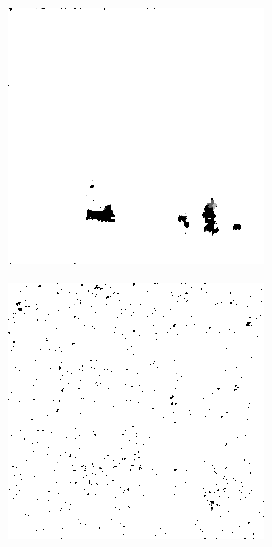 \begin{figure}[H]
\begin{minipage}[t]{0.245\textwidth}
    \label{fig:noise_15_6}
    \includegraphics[width = \textwidth]{result/noisy/1_15_0.png}
    \label{fig:noise_15_0}
\end{minipage}
\begin{minipage}[t]{0.245\textwidth}
    \includegraphics[width = \textwidth]{result/noisy/1_20_20.png}

\end{minipage}
\end{figure}
